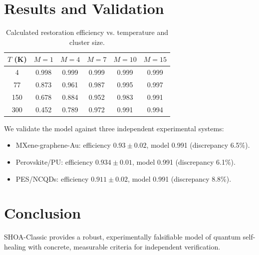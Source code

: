 \documentclass[12pt]{article}
\begin{document}
\section{Results and Validation}
\begin{table}[h]
\centering
\caption{Calculated restoration efficiency vs. temperature and cluster size.}
\begin{tabular}{c|ccccc}
\hline
$T$ (K) & $M=1$ & $M=4$ & $M=7$ & $M=10$ & $M=15$ \\
\hline
4   & 0.998 & 0.999 & 0.999 & 0.999 & 0.999 \\
77  & 0.873 & 0.961 & 0.987 & 0.995 & 0.997 \\
150 & 0.678 & 0.884 & 0.952 & 0.983 & 0.991 \\
300 & 0.452 & 0.789 & 0.972 & 0.991 & 0.994 \\
\hline
\end{tabular}
\end{table}

We validate the model against three independent experimental systems:
\begin{itemize}
    \item MXene-graphene-Au: efficiency $0.93 \pm 0.02$, model 0.991 (discrepancy 6.5\%).
    \item Perovskite/PU: efficiency $0.934 \pm 0.01$, model 0.991 (discrepancy 6.1\%).
    \item PES/NCQDs: efficiency $0.911 \pm 0.02$, model 0.991 (discrepancy 8.8\%).
\end{itemize}

\section{Conclusion}
SHOA-Classic provides a robust, experimentally falsifiable model of quantum self-healing with concrete, measurable criteria for independent verification.
\end{document}
